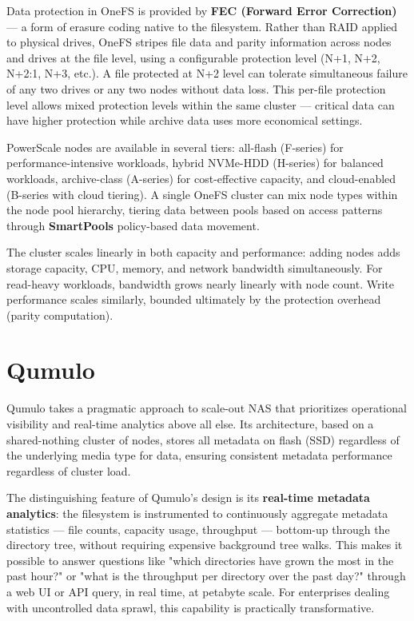 Data protection in OneFS is provided by \textbf{FEC (Forward Error Correction)} --- a form of erasure coding native to the filesystem. Rather than RAID applied to physical drives, OneFS stripes file data and parity information across nodes and drives at the file level, using a configurable protection level (N+1, N+2, N+2:1, N+3, etc.). A file protected at N+2 level can tolerate simultaneous failure of any two drives or any two nodes without data loss. This per-file protection level allows mixed protection levels within the same cluster --- critical data can have higher protection while archive data uses more economical settings.

PowerScale nodes are available in several tiers: all-flash (F-series) for performance-intensive workloads, hybrid NVMe-HDD (H-series) for balanced workloads, archive-class (A-series) for cost-effective capacity, and cloud-enabled (B-series with cloud tiering). A single OneFS cluster can mix node types within the node pool hierarchy, tiering data between pools based on access patterns through \textbf{SmartPools} policy-based data movement.

The cluster scales linearly in both capacity and performance: adding nodes adds storage capacity, CPU, memory, and network bandwidth simultaneously. For read-heavy workloads, bandwidth grows nearly linearly with node count. Write performance scales similarly, bounded ultimately by the protection overhead (parity computation).

\section{Qumulo}
Qumulo takes a pragmatic approach to scale-out NAS that prioritizes operational visibility and real-time analytics above all else. Its architecture, based on a shared-nothing cluster of nodes, stores all metadata on flash (SSD) regardless of the underlying media type for data, ensuring consistent metadata performance regardless of cluster load.

The distinguishing feature of Qumulo's design is its \textbf{real-time metadata analytics}: the filesystem is instrumented to continuously aggregate metadata statistics --- file counts, capacity usage, throughput --- bottom-up through the directory tree, without requiring expensive background tree walks. This makes it possible to answer questions like "which directories have grown the most in the past hour?" or "what is the throughput per directory over the past day?" through a web UI or API query, in real time, at petabyte scale. For enterprises dealing with uncontrolled data sprawl, this capability is practically transformative.

